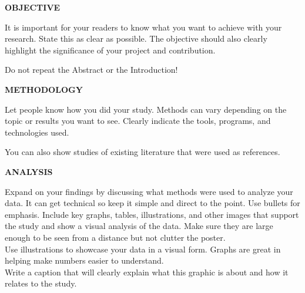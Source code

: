 \documentclass[12pt]{article}
\begin{document}
\begin{paracol}{2}
\begin{multicols}{3}
		\columnbreak

		{\large\textbf{OBJECTIVE}}\\
		\vspace{-0.3cm}

		It is important for your readers to know what you want to achieve with your research.
		State this as clear as possible. The objective should also clearly highlight the
		significance of your project and contribution.

		Do not repeat the Abstract or the Introduction!

		\columnbreak

		{\large\textbf{METHODOLOGY}}\\
		\vspace{-0.3cm}

		Let people know how you did your study. Methods can vary depending on the topic or
		results you want to see. Clearly indicate the tools, programs, and technologies used.
	
		You can also show studies of existing literature that were used as references.
	\end{multicols}

	\begin{tcolorbox}[colback=off.white!80, colframe=off.white!80, arc=0.01mm]
		\begin{multicols}{2}
			{\large\textbf{ANALYSIS}}\\
			\vspace{-0.3cm}

			Expand on your findings by discussing what methods were used to analyze your data.
			It can get technical so keep it simple and direct to the point. Use bullets for emphasis.
			Include key graphs, tables, illustrations, and other images that support the study and
			show a visual analysis of the data. Make sure they are large enough to be seen from a
			distance but not clutter the poster.\\

			Use illustrations to showcase your data in a visual form. Graphs are great in helping
			make numbers easier to understand.\\

			Write a caption that will clearly explain what this graphic is about and how it
			relates to the study.

			\columnbreak

			\begin{figure}[H]  %
				\centering
\end{figure}
\end{multicols}
\end{tcolorbox}
\end{paracol}
\end{document}
